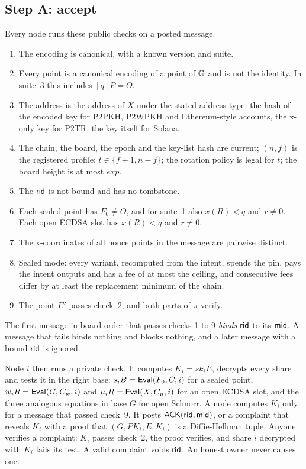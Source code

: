 \subsection{Step A: accept}\label{sec:stepa}

Every node runs these public checks on a posted message.

\begin{enumerate}[leftmargin=1.7em,itemsep=1pt]
\item The encoding is canonical, with a known version and suite.
\item Every point is a canonical encoding of a point of $\mathbb{G}$ and is not the identity. In suite~3 this includes $[q]P = O$.
\item The address is the address of $X$ under the stated address type: the hash of the encoded key for P2PKH, P2WPKH and Ethereum-style accounts, the x-only key for P2TR, the key itself for Solana.
\item The chain, the board, the epoch and the key-list hash are current; $(n,f)$ is the registered profile; $t \in \{f+1, n-f\}$; the rotation policy is legal for $t$; the board height is at most $exp$.
\item The $\mathsf{rid}$ is not bound and has no tombstone.
\item Each sealed point has $F_0 \neq O$, and for suite~1 also $x(R) < q$ and $r \neq 0$. Each open ECDSA slot has $x(R) < q$ and $r \neq 0$.
\item The x-coordinates of all nonce points in the message are pairwise distinct.
\item Sealed mode: every variant, recomputed from the intent, spends the pin, pays the intent outputs and has a fee of at most the ceiling, and consecutive fees differ by at least the replacement minimum of the chain.
\item The point $E'$ passes check~2, and both parts of $\pi$ verify.
\end{enumerate}

The first message in board order that passes checks 1 to 9 \emph{binds} $\mathsf{rid}$ to its $\mathsf{mid}$. A message that fails binds nothing and blocks nothing, and a later message with a bound $\mathsf{rid}$ is ignored.

Node $i$ then runs a private check. It computes $K_i = sk_i E$, decrypts every share and tests it in the right base: $s_i B = \mathsf{Eval}(F_0, C, i)$ for a sealed point, $w_i R = \mathsf{Eval}(G, C_w, i)$ and $\mu_i R = \mathsf{Eval}(X, C_\mu, i)$ for an open ECDSA slot, and the three analogous equations in base $G$ for open Schnorr. A node computes $K_i$ only for a message that passed check~9. It posts $\textsf{ACK}(\mathsf{rid}, \mathsf{mid})$, or a complaint that reveals $K_i$ with a proof that $(G, PK_i, E, K_i)$ is a Diffie-Hellman tuple. Anyone verifies a complaint: $K_i$ passes check~2, the proof verifies, and share $i$ decrypted with $K_i$ fails its test. A valid complaint voids $\mathsf{rid}$. An honest owner never causes one.

